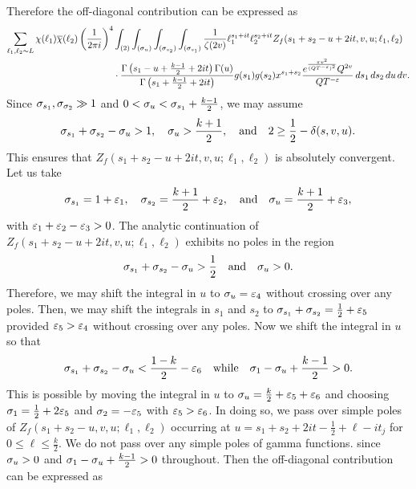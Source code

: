 \documentclass[12pt,reqno,oneside]{amsart}
\begin{document}
    Therefore the off-diagonal contribution can be expressed as
    \begin{align*}
      \sum_{\ell_{1},\ell_{2} \sim L}\chi(\ell_{1})\overline{\chi}(\ell_{2})\left(\frac{1}{2\pi i}\right)^{4}&\int_{(2)}\int_{(\sigma_{u})}\int_{(\sigma_{s_{2}})}\int_{(\sigma_{s_{1}})}\frac{1}{\zeta(2v)}\ell_{1}^{s_{1}+it}\ell_{2}^{s_{2}+it}Z_{f}(s_{1}+s_{2}-u+2it,v,u;\ell_{1},\ell_{2}) \\
      &\cdot \frac{\Gamma\left(s_{1}-u+\frac{k-1}{2}+2it\right)\Gamma(u)}{\Gamma\left(s_{1}+\frac{k-1}{2}+2it\right)}g(s_{1})g(s_{2})x^{s_{1}+s_{2}}\frac{e^{\frac{\pi v^{2}}{(QT^{-\varepsilon})^{2}}}Q^{2v}}{QT^{-\varepsilon}}\,ds_{1}\,ds_{2}\,du\,dv.
    \end{align*}
    Since $\sigma_{s_{1}},\sigma_{\sigma_{2}} \gg 1$ and $0 < \sigma_{u} < \sigma_{s_{1}}+\frac{k-1}{2}$, we may assume
    \[
      \sigma_{s_{1}}+\sigma_{s_{2}}-\sigma_{u} > 1, \quad \sigma_{u} > \frac{k+1}{2}, \quad \text{and} \quad 2 \ge \frac{1}{2}-\delta(s,v,u).
    \]
    This ensures that $Z_{f}(s_{1}+s_{2}-u+2it,v,u;\ell_{1},\ell_{2})$ is absolutely convergent. Let us take
    \[
      \sigma_{s_{1}} = 1+\varepsilon_{1}, \quad \sigma_{s_{2}} = \frac{k+1}{2}+\varepsilon_{2}, \quad \text{and} \quad \sigma_{u} = \frac{k+1}{2}+\varepsilon_{3},
    \]
    with $\varepsilon_{1}+\varepsilon_{2}-\varepsilon_{3} > 0$. The analytic continuation of $Z_{f}(s_{1}+s_{2}-u+2it,v,u;\ell_{1},\ell_{2})$ exhibits no poles in the region
    \[
      \sigma_{s_{1}}+\sigma_{s_{2}}-\sigma_{u} > \frac{1}{2} \quad \text{and} \quad \sigma_{u} > 0.
    \]
    Therefore, we may shift the integral in $u$ to $\sigma_{u} = \varepsilon_{4}$ without crossing over any poles. Then, we may shift the integrals in $s_{1}$ and $s_{2}$ to $\sigma_{s_{1}}+\sigma_{s_{2}} = \frac{1}{2}+\varepsilon_{5}$ provided $\varepsilon_{5} > \varepsilon_{4}$ without crossing over any poles. Now we shift the integral in $u$ so that
    \[
      \sigma_{s_{1}}+\sigma_{s_{2}}-\sigma_{u} < \frac{1-k}{2}-\varepsilon_{6} \quad \text{while} \quad \sigma_{1}-\sigma_{u}+\frac{k-1}{2} > 0.
    \]
    This is possible by moving the integral in $u$ to $\sigma_{u} = \frac{k}{2}+\varepsilon_{5}+\varepsilon_{6}$ and choosing $\sigma_{1} = \frac{1}{2}+2\varepsilon_{5}$ and $\sigma_{2} = -\varepsilon_{5}$ with $\varepsilon_{5} > \varepsilon_{6}$. In doing so, we pass over simple poles of $Z_{f}(s_{1}+s_{2}-u,v,u;\ell_{1},\ell_{2})$ occurring at $u = s_{1}+s_{2}+2it-\frac{1}{2}+\ell-it_{j}$ for $0 \le \ell \le \frac{k}{2}$. We do not pass over any simple poles of gamma functions. since $\sigma_{u} > 0$ and $\sigma_{1}-\sigma_{u}+\frac{k-1}{2} > 0$ throughout. Then the off-diagonal contribution can be expressed as
\end{document}
